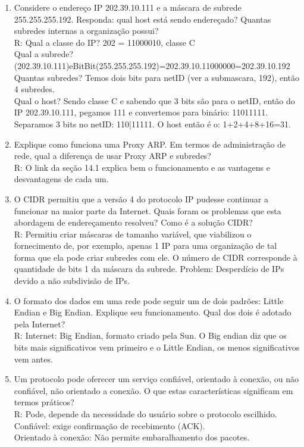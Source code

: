 \documentclass{article}
\begin{document}
\begin{enumerate}
	\item Considere o endereço IP 202.39.10.111 e a máscara de subrede 255.255.255.192. Responda: qual host está sendo endereçado? Quantas subredes internas a organização possui?
	\\R: Qual a classe do IP? 202 = 11000010, classe C
	\\Qual a subrede? (202.39.10.111)eBitBit(255.255.255.192)=202.39.10.11000000=202.39.10.192
	\\Quantas subredes? Temos dois bits para netID (ver a submascara, 192), então 4 subredes.
	\\Qual o host? Sendo classe C e sabendo que 3 bits são para o netID, então do IP 202.39.10.111, pegamos 111 e convertemos para binário: 11011111. Separamos 3 bits no netID: 110|11111. O host então é o: 1+2+4+8+16=31.

	\item Explique como funciona uma Proxy ARP. Em termos de administração de rede, qual a diferença de usar Proxy ARP e subredes?
	\\R: O link da seção 14.1 explica bem o funcionamento e as vantagens e desvantagens de cada um.

	\item O CIDR permitiu que a versão 4 do protocolo IP pudesse continuar a funcionar na maior parte da Internet. Quais foram os problemas que esta abordagem de endereçamento resolveu? Como é a solução CIDR?
	\\R: Permitiu criar máscaras de tamanho variável, que viabilizou o fornecimento de, por exemplo, apenas 1 IP para uma organização de tal forma que ela pode criar subredes com ele. O número de CIDR corresponde à quantidade de bits 1 da máscara da subrede. Problem: Desperdício de IPs devido a não subdivisão de IPs.

	\item O formato dos dados em uma rede pode seguir um de dois padrões: Little Endian e Big Endian. Explique seu funcionamento. Qual dos dois é adotado pela Internet?
	\\R: Internet: Big Endian, formato criado pela Sun. O Big endian diz que os bits mais significativos vem primeiro e o Little Endian, os menos significativos vem antes.

	\item Um protocolo pode oferecer um serviço confiável, orientado à conexão, ou não confiável, não orientado a conexão. O que estas características significam em termos práticos?
	\\R: Pode, depende da necessidade do usuário sobre o protocolo escilhido.
	\\Confiável: exige confirmação de recebimento (ACK).
	\\Orientado à conexão: Não permite embaralhamento dos pacotes.


\end{enumerate}
\end{document}
